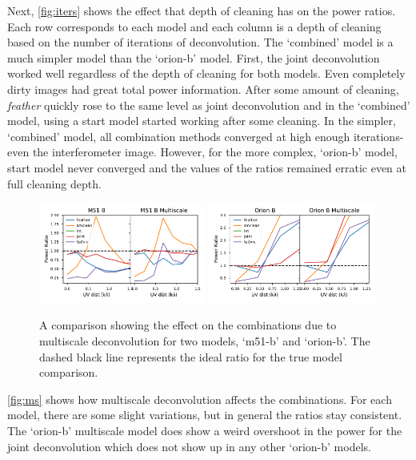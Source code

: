 \documentclass[manuscript,linenumbers]{aastex62}
\begin{document}
Next, \autoref{fig:iters} shows the effect that depth of cleaning has on the power ratios. Each row corresponds to each model and each column is a depth of cleaning based on the number of iterations of deconvolution. The `combined' model is a much simpler model than the `orion-b' model. First, the joint deconvolution worked well regardless of the depth of cleaning for both models. Even completely dirty images had great total power information. After some amount of cleaning, \textit{feather} quickly rose to the same level as joint deconvolution and in the `combined' model, using a start model started working after some cleaning. In the simpler, `combined' model, all combination methods converged at high enough iterations- even the interferometer image. However, for the more complex, `orion-b' model, start model never converged and the values of the ratios remained erratic even at full cleaning depth.

\begin{figure}[ht]
    \includegraphics[width=0.49\textwidth]{figures/M51-B-Multiscale}
    \includegraphics[width=0.49\textwidth]{figures/Orion-B-Multiscale}
    \caption{A comparison showing the effect on the combinations due to multiscale deconvolution for two models, `m51-b' and `orion-b'. The dashed black line represents the ideal ratio for the true model comparison. }
    \label{fig:ms}
\end{figure}

\autoref{fig:ms} shows how multiscale deconvolution affects the combinations. For each model, there are some slight variations, but in general the ratios stay consistent. The `orion-b' multiscale model does show a weird overshoot in the power for the joint deconvolution which does not show up in any other `orion-b' models. 
\end{document}
